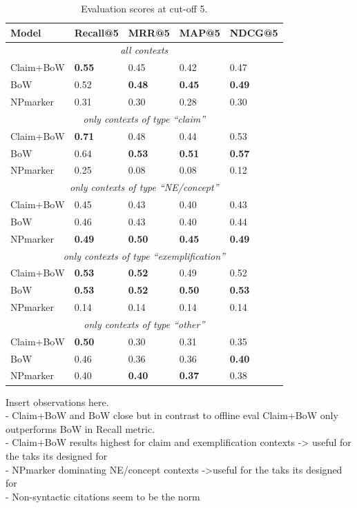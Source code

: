 \begin{table}[tb]
\centering
    \caption{Evaluation scores at cut-off 5.}
    \label{tab:arxivevalnumbers}
\begin{center}
    \begin{tabular}{lllll}
    \toprule
    Model & Recall@5 & MRR@5 & MAP@5 & NDCG@5 \\
    \midrule
    \multicolumn{5}{c}{\emph{all contexts}} \\
    \midrule
    Claim+BoW & \textbf{0.55} & 0.45 & 0.42 & 0.47 \\
    BoW       & 0.52 & \textbf{0.48} & \textbf{0.45} & \textbf{0.49} \\
    NPmarker  & 0.31 & 0.30 & 0.28 & 0.30 \\
    \midrule
    \multicolumn{5}{c}{\emph{only contexts of type ``claim''}} \\
    \midrule
    Claim+BoW & \textbf{0.71} & 0.48 & 0.44 & 0.53 \\
    BoW       & 0.64 & \textbf{0.53} & \textbf{0.51} & \textbf{0.57} \\
    NPmarker  & 0.25 & 0.08 & 0.08 & 0.12 \\
    \midrule
    \multicolumn{5}{c}{\emph{only contexts of type ``NE/concept''}} \\
    \midrule
    Claim+BoW & 0.45 & 0.43 & 0.40 & 0.43 \\
    BoW       & 0.46 & 0.43 & 0.40 & 0.44 \\
    NPmarker  & \textbf{0.49} & \textbf{0.50} & \textbf{0.45} & \textbf{0.49} \\
    \midrule
    \multicolumn{5}{c}{\emph{only contexts of type ``exemplification''}} \\
    \midrule
    Claim+BoW & \textbf{0.53} & \textbf{0.52} & 0.49 & 0.52 \\
    BoW       & \textbf{0.53} & \textbf{0.52} & \textbf{0.50} & \textbf{0.53} \\
    NPmarker  & 0.14 & 0.14 & 0.14 & 0.14 \\
    \midrule
    \multicolumn{5}{c}{\emph{only contexts of type ``other''}} \\
    \midrule
    Claim+BoW & \textbf{0.50} & 0.30 & 0.31 & 0.35 \\
    BoW       & 0.46 & 0.36 & 0.36 & \textbf{0.40} \\
    NPmarker  & 0.40 & \textbf{0.40} & \textbf{0.37} & 0.38 \\
    \bottomrule
    \end{tabular}
\end{center}
\end{table}

Insert observations here.\\
- Claim+BoW and BoW close but in contrast to offline eval Claim+BoW only outperforms BoW in Recall metric.\\
- Claim+BoW results highest for claim and exemplification contexts -> useful for the taks its designed for\\
- NPmarker dominating NE/concept contexts ->useful for the taks its designed for\\
- Non-syntactic citations seem to be the norm

